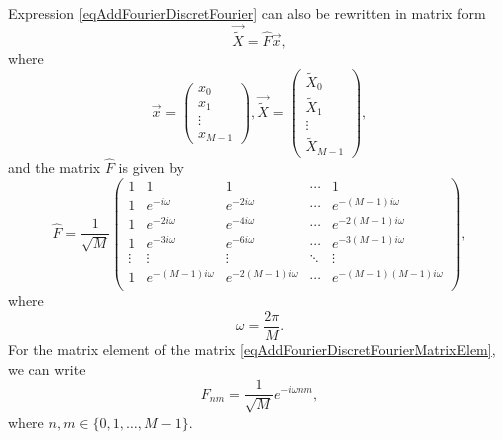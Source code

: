 Expression \eqref{eqAddFourierDiscretFourier} can also be rewritten in matrix form
\begin{equation}
\vec{\tilde{X}} = \hat{F} \vec{x},
\nonumber
\end{equation}
where
\begin{equation}
\vec{x} = 
\left(
\begin{array}{c}
x_0 \\
x_1 \\
\vdots \\
x_{M-1}
\end{array}
\right)
,
\vec{\tilde{X}} = 
\left(
\begin{array}{c}
\tilde{X}_0 \\
\tilde{X}_1 \\
\vdots \\
\tilde{X}_{M-1}
\end{array}
\right)
,
\nonumber
\end{equation}
and the matrix $\hat{F}$ is given by
\begin{equation}
\hat{F} = 
\frac{1}{\sqrt{M}}
\begin{pmatrix}
1 & 1 & 1 & \cdots & 1 \\
1 & e^{-i \omega} & e^{-2 i \omega} & \cdots & 
e^{-\left( M - 1 \right) i \omega} \\
1 & e^{-2 i \omega} & e^{-4 i \omega} & \cdots & 
e^{-2 \left( M - 1 \right) i \omega} \\
1 & e^{-3 i \omega} & e^{-6 i \omega} & \cdots & 
e^{-3 \left( M - 1 \right) i \omega} \\
\vdots & \vdots & \vdots & \ddots & \vdots \\
1 & e^{-\left( M - 1 \right) i \omega} & e^{-2\left( M - 1 \right) i \omega} & \cdots & 
e^{- \left( M - 1 \right)\left( M - 1 \right) i \omega} \\
\end{pmatrix}
,
\label{eqAddFourierDiscretFourierMatrixElem}
\end{equation}
where
\[
\omega = \frac{2 \pi}{M}.
\]
For the matrix element of the matrix
\eqref{eqAddFourierDiscretFourierMatrixElem}, we can write
\begin{equation}
F_{n m} = \frac{1}{\sqrt{M}}e^{-i \omega n m},
\label{eqAddFourierDiscretFourierMatrixElem2}
\end{equation}
where $n, m \in \{ 0, 1, \dots, M - 1\}$.
